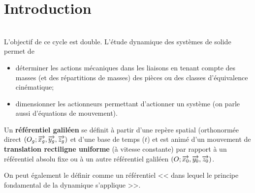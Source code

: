 \documentclass[10pt,fleqn]{article} %
\begin{document}

\setlength{\columnseprule}{.1pt}

\vspace{2cm}
\pagestyle{fancy}
\thispagestyle{plain}


\section{Introduction}
\begin{obj} ~\\
L'objectif de ce cycle est double. L'étude dynamique des systèmes de solide permet de 
\begin{itemize}
\item déterminer les actions mécaniques dans les liaisons en tenant compte des masses (et des répartitions de masses) des pièces ou des classes d'équivalence cinématique;
\item dimensionner les actionneurs permettant d'actionner un système (on parle aussi d'équations de mouvement).
\end{itemize}
\end{obj}


\begin{definition}
Un \textbf{référentiel galiléen} se définit à partir d'une repère spatial (orthonormée direct $\left(O_g;\overrightarrow{x_g},\overrightarrow{y_g},\overrightarrow{z_g} \right)$ et d'une base de temps ($t$) et est animé d'un mouvement de \textbf{translation rectiligne uniforme} (à vitesse constante) par rapport à un référentiel absolu fixe ou à un autre référentiel galiléen $\left(O;\overrightarrow{x_0},\overrightarrow{y_0},\overrightarrow{z_0} \right)$. 

On peut également le définir comme un référentiel << dans lequel le principe fondamental de la dynamique s'applique >>.
\end{definition}
\end{document}
